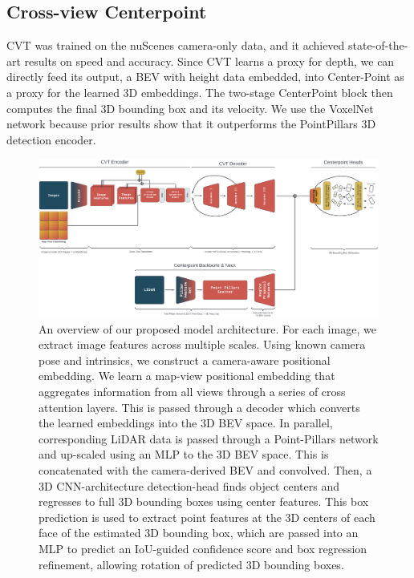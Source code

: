 \documentclass[a4paper,12pt]{article}
\begin{document}
\begin{multicols}{2}
\subsection{Cross-view Centerpoint}
CVT was trained on the nuScenes camera-only data, and it achieved state-of-the-art results on speed and accuracy. Since CVT learns a proxy for depth, we can directly feed its output, a BEV with height data embedded, into Center-Point as a proxy for the learned 3D embeddings. The two-stage CenterPoint block then computes the final 3D bounding box and its velocity. We use the VoxelNet network because prior results show that it outperforms the PointPillars 3D detection encoder.

\end{multicols}

\begin{figure}[t]
    \centering
    \includegraphics[width=16cm]{NewModelArchitectureV2.png}
    \caption{An overview of our proposed model architecture. For each image, we extract image features across multiple scales. Using known camera pose and intrinsics, we construct a camera-aware positional embedding. We learn a map-view positional embedding that aggregates information from all views through a series of cross attention layers. This is passed through a decoder which converts the learned embeddings into the 3D BEV space. In parallel, corresponding LiDAR data is passed through a Point-Pillars network and up-scaled using an MLP to the 3D BEV space. This is concatenated with the camera-derived BEV and convolved. Then, a 3D CNN-architecture detection-head finds object centers and regresses to full 3D bounding boxes using center features. This box prediction is used to extract point features at the 3D centers of each face of the estimated 3D bounding box, which are passed into an MLP to predict an IoU-guided confidence score and box regression refinement, allowing rotation of predicted 3D bounding boxes.}
    \label{fig:architecture}
\end{figure}
\end{document}

